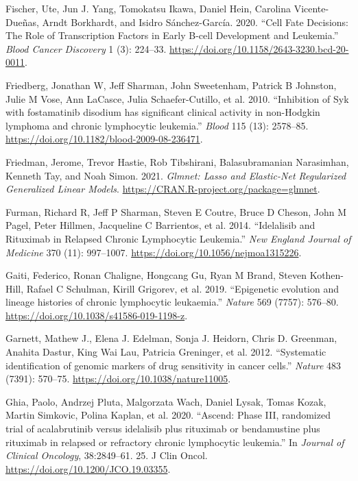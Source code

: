 \documentclass[11pt, a4paper, twosided]{book}
\newenvironment{CSLReferences}%
  {}%
  {\par}
\begin{document}
\begin{CSLReferences}{1}{0}
\leavevmode{}%
Fischer, Ute, Jun J. Yang, Tomokatsu Ikawa, Daniel Hein, Carolina Vicente-Dueñas, Arndt Borkhardt, and Isidro Sánchez-García. 2020. {``{Cell Fate Decisions: The Role of Transcription Factors in Early B-cell Development and Leukemia}.''} \emph{Blood Cancer Discovery} 1 (3): 224--33. \url{https://doi.org/10.1158/2643-3230.bcd-20-0011}.

\leavevmode{}%
Friedberg, Jonathan W, Jeff Sharman, John Sweetenham, Patrick B Johnston, Julie M Vose, Ann LaCasce, Julia Schaefer-Cutillo, et al. 2010. {``{Inhibition of Syk with fostamatinib disodium has significant clinical activity in non-Hodgkin lymphoma and chronic lymphocytic leukemia}.''} \emph{Blood} 115 (13): 2578--85. \url{https://doi.org/10.1182/blood-2009-08-236471}.

\leavevmode{}%
Friedman, Jerome, Trevor Hastie, Rob Tibshirani, Balasubramanian Narasimhan, Kenneth Tay, and Noah Simon. 2021. \emph{Glmnet: Lasso and Elastic-Net Regularized Generalized Linear Models}. \url{https://CRAN.R-project.org/package=glmnet}.

\leavevmode{}%
Furman, Richard R, Jeff P Sharman, Steven E Coutre, Bruce D Cheson, John M Pagel, Peter Hillmen, Jacqueline C Barrientos, et al. 2014. {``{Idelalisib and Rituximab in Relapsed Chronic Lymphocytic Leukemia}.''} \emph{New England Journal of Medicine} 370 (11): 997--1007. \url{https://doi.org/10.1056/nejmoa1315226}.

\leavevmode{}%
Gaiti, Federico, Ronan Chaligne, Hongcang Gu, Ryan M Brand, Steven Kothen-Hill, Rafael C Schulman, Kirill Grigorev, et al. 2019. {``{Epigenetic evolution and lineage histories of chronic lymphocytic leukaemia}.''} \emph{Nature} 569 (7757): 576--80. \url{https://doi.org/10.1038/s41586-019-1198-z}.

\leavevmode{}%
Garnett, Mathew J., Elena J. Edelman, Sonja J. Heidorn, Chris D. Greenman, Anahita Dastur, King Wai Lau, Patricia Greninger, et al. 2012. {``{Systematic identification of genomic markers of drug sensitivity in cancer cells}.''} \emph{Nature} 483 (7391): 570--75. \url{https://doi.org/10.1038/nature11005}.

\leavevmode{}%
Ghia, Paolo, Andrzej Pluta, Malgorzata Wach, Daniel Lysak, Tomas Kozak, Martin Simkovic, Polina Kaplan, et al. 2020. {``{Ascend: Phase III, randomized trial of acalabrutinib versus idelalisib plus rituximab or bendamustine plus rituximab in relapsed or refractory chronic lymphocytic leukemia}.''} In \emph{Journal of Clinical Oncology}, 38:2849--61. 25. J Clin Oncol. \url{https://doi.org/10.1200/JCO.19.03355}.


\end{CSLReferences}
\end{document}
